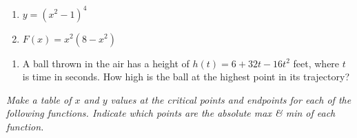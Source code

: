 \documentclass[10pt]{article}
\begin{document}
\begin{multicols}{2}
\begin{enumerate}
\setcounter{enumi}{\theenumCount}
\item $y=(x^2-1)^4$ 


\item $F(x) = x^2(8-x^2)$ 

\setcounter{enumCount}{\theenumi}
\end{enumerate}
\end{multicols}

\vfill

\begin{enumerate}
\setcounter{enumi}{\theenumCount}
\item A ball thrown in the air has a height of $h(t) = 6 + 32 t - 16t^2$ feet, where $t$ is time in seconds.  How high is the ball at the highest point in its trajectory?
\vfill
\vfill
\vfill
\setcounter{enumCount}{\theenumi}
\end{enumerate}

\newpage
\noindent
\textit{Make a table of $x$ and $y$ values at the critical points and endpoints for each of the following functions.  Indicate which points are the absolute max \& min of each function.}
\end{document}
